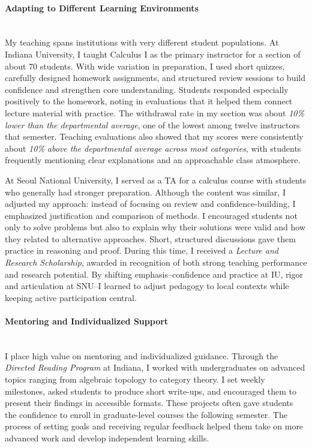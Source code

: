 \documentclass[11pt]{article}
\begin{document}
\paragraph{Adapting to Different Learning Environments} \quad \\
My teaching spans institutions with very different student populations.
At Indiana University, I taught Calculus I as the primary instructor for a section of about 70 students.
With wide variation in preparation, I used short quizzes, carefully designed homework assignments, and structured review sessions to build confidence and strengthen core understanding. 
Students responded especially positively to the homework, noting in evaluations that it helped them connect lecture material with practice.
The withdrawal rate in my section was about \emph{10\% lower than the departmental average}, one of the lowest among twelve instructors that semester. Teaching evaluations also showed that my scores were consistently about \emph{10\% above the departmental average across most categories}, with students frequently mentioning clear explanations and an approachable class atmosphere.

At Seoul National University, I served as a TA for a calculus course with students who generally had stronger preparation. 
Although the content was similar, I adjusted my approach: instead of focusing on review and confidence-building, I emphasized justification and comparison of methods. 
I encouraged students not only to solve problems but also to explain why their solutions were valid and how they related to alternative approaches. 
Short, structured discussions gave them practice in reasoning and proof.
During this time, I received a \emph{Lecture and Research Scholarship}, awarded in recognition of both strong teaching performance and research potential.
By shifting emphasis--confidence and practice at IU, rigor and articulation at SNU--I learned to adjust pedagogy to local contexts while keeping active participation central.


\paragraph{Mentoring and Individualized Support}\quad \\
I place high value on mentoring and individualized guidance.
Through the \emph{Directed Reading Program} at Indiana, I worked with undergraduates on advanced topics ranging from algebraic topology to category theory.
I set weekly milestones, asked students to produce short write-ups, and encouraged them to present their findings in accessible formats.
These projects often gave students the confidence to enroll in graduate-level courses the following semester.
The process of setting goals and receiving regular feedback helped them take on more advanced work and develop independent learning skills.
\end{document}
